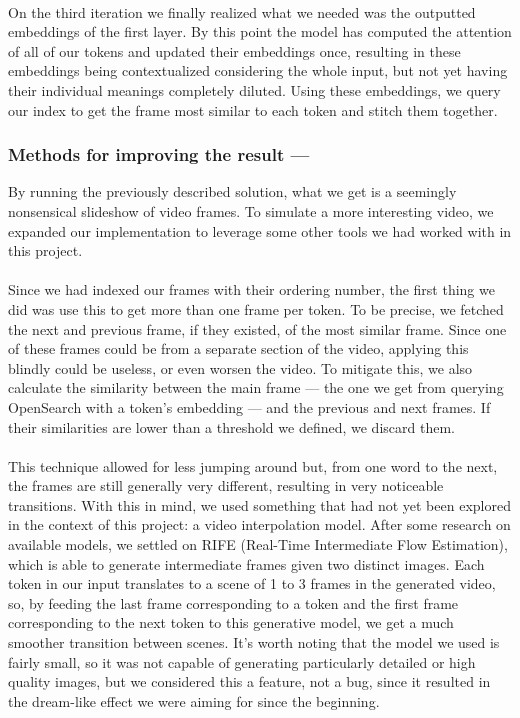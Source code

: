 \documentclass[runningheads]{llncs}
\begin{document}
\paragraph{}
On the third iteration we finally realized what we needed was the outputted embeddings of the first layer. By this point the model has computed the attention of all of our tokens and updated their embeddings once, resulting in these embeddings being contextualized considering the whole input, but not yet having their individual meanings completely diluted. Using these embeddings, we query our index to get the frame most similar to each token and stitch them together.

\subsubsection{Methods for improving the result —}
By running the previously described solution, what we get is a seemingly nonsensical slideshow of video frames. To simulate a more interesting video, we expanded our implementation to leverage some other tools we had worked with in this project. 
\paragraph{}
Since we had indexed our frames with their ordering number, the first thing we did was use this to get more than one frame per token. To be precise, we fetched the next and previous frame, if they existed, of the most similar frame. Since one of these frames could be from a separate section of the video, applying this blindly could be useless, or even worsen the video. To mitigate this, we also calculate the similarity between the main frame — the one we get from querying OpenSearch with a token's embedding — and the previous and next frames. If their similarities are lower than a threshold we defined, we discard them. 
\paragraph{}
This technique allowed for less jumping around but, from one word to the next, the frames are still generally very different, resulting in very noticeable transitions. With this in mind, we used something that had not yet been explored in the context of this project: a video interpolation model. After some research on available models, we settled on RIFE (Real-Time Intermediate Flow Estimation), which is able to generate intermediate frames given two distinct images. Each token in our input translates to a scene of 1 to 3 frames in the generated video, so, by feeding the last frame corresponding to a token and the first frame corresponding to the next token to this generative model, we get a much smoother transition between scenes. It's worth noting that the model we used is fairly small, so it was not capable of generating particularly detailed or high quality images, but we considered this a feature, not a bug, since it resulted in the dream-like effect we were aiming for since the beginning.
\end{document}
